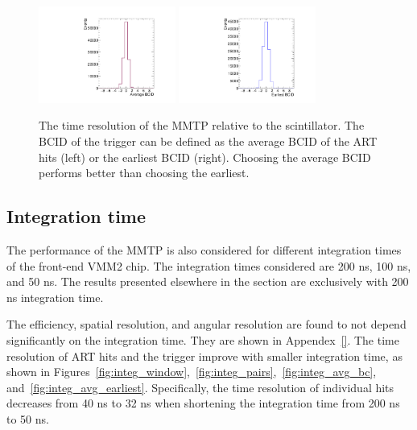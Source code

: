 \begin{figure}[!htpb]
  \begin{center}
    \includegraphics[width=0.4\textwidth]{figures/gbtanalysis3522/avg_BCID.pdf}
    \includegraphics[width=0.4\textwidth]{figures/gbtanalysis3522/earliest_BCID.pdf}
  \end{center}
  \vspace{-10pt}
  \caption{The time resolution of the MMTP relative to the scintillator. The BCID of the trigger can be defined as the average BCID of the ART hits (left) or the earliest BCID (right). Choosing the average BCID performs better than choosing the earliest.}
  \label{fig:timeres}
\end{figure}

\subsection{Integration time}
\label{sec:perf-integ}

The performance of the MMTP is also considered for different integration times of the front-end VMM2 chip. The integration times considered are 200 ns, 100 ns, and 50 ns. The results presented elsewhere in the section are exclusively with 200 ns integration time.

The efficiency, spatial resolution, and angular resolution are found to not depend significantly on the integration time. They are shown in Appendex~\ref{}. The time resolution of ART hits and the trigger improve with smaller integration time, as shown in Figures~\ref{fig:integ_window},~\ref{fig:integ_pairs},~\ref{fig:integ_avg_bc}, and~\ref{fig:integ_avg_earliest}. Specifically, the time resolution of individual hits decreases from 40 ns to 32 ns when shortening the integration time from 200 ns to 50 ns.

